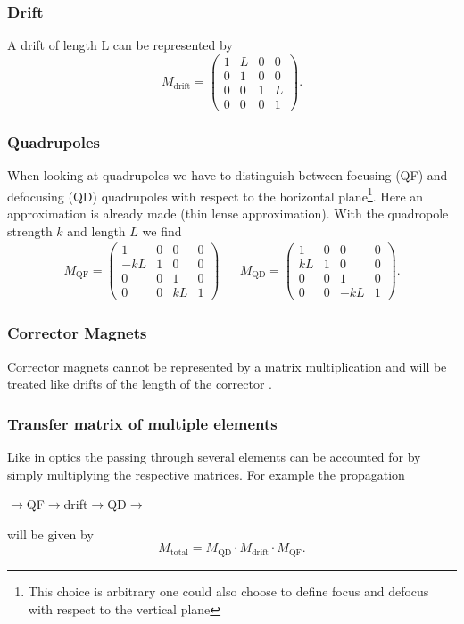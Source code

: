 \documentclass[11pt,a4paper,notitlepage]{scrartcl}
\begin{document}
\subsubsection*{Drift}
A drift of length L can be represented by
\begin{equation}
	M_{\text{drift}}=\begin{pmatrix}
		1 & L & 0&0\\
		0 & 1 & 0&0\\
		0&0&1&L\\
		0&0&0&1
	\end{pmatrix}.
\end{equation}

\subsubsection*{Quadrupoles}
When looking at quadrupoles we have to distinguish between focusing (QF) and defocusing (QD) quadrupoles with respect to the horizontal plane\footnote{This choice is arbitrary one could also choose to define focus and defocus with respect to the vertical plane}. Here an approximation is already made (thin lense approximation). With the quadropole strength $k$ and length $L$ we find 
\begin{align}
	M_{\text{QF}}=\begin{pmatrix}
		1 & 0 & 0&0\\
		-kL & 1 & 0&0\\
		0&0&1&0\\
		0&0&kL&1
	\end{pmatrix}
&&
	M_{\text{QD}}=\begin{pmatrix}
	1 & 0 & 0&0\\
	kL & 1 & 0&0\\
	0&0&1&0\\
	0&0&-kL&1
\end{pmatrix}.
\end{align}
\subsubsection*{Corrector Magnets}
Corrector magnets cannot be represented by a matrix multiplication and will be treated like drifts of the length of the corrector \cite{script}.
\subsubsection*{Transfer matrix of multiple elements}
Like in optics the passing through several elements can be accounted for by simply multiplying the respective matrices. For example the propagation \begin{center}
	$\to$QF$\to$drift$\to$QD$\to$
\end{center} will be given by 
\begin{equation}
		M_{\text{total}}=M_\text{QD}\cdot M_\text{drift}\cdot M_\text{QF}.
\end{equation}
\end{document}
